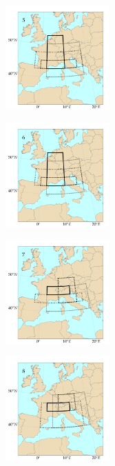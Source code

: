 \documentclass[twocol]{ametsoc}
\begin{document}
\begin{figure}[htb]
	\begin{subfigure}{.5\columnwidth}
		\centering
		\includegraphics[width=4cm]{figures/spatial_win_z4/Spatial_windows_5.png}
	\end{subfigure}%
	\begin{subfigure}{.5\columnwidth}
		\centering
		\includegraphics[width=4cm]{figures/spatial_win_z4/Spatial_windows_6.png}
	\end{subfigure}
	\begin{subfigure}{.5\columnwidth}
		\centering
		\includegraphics[width=4cm]{figures/spatial_win_z4/Spatial_windows_7.png}
	\end{subfigure}%
	\begin{subfigure}{.5\columnwidth}
		\centering
		\includegraphics[width=4cm]{figures/spatial_win_z4/Spatial_windows_8.png}
	\end{subfigure}
	\begin{subfigure}{.5\columnwidth}

\end{subfigure}
\end{figure}
\end{document}
